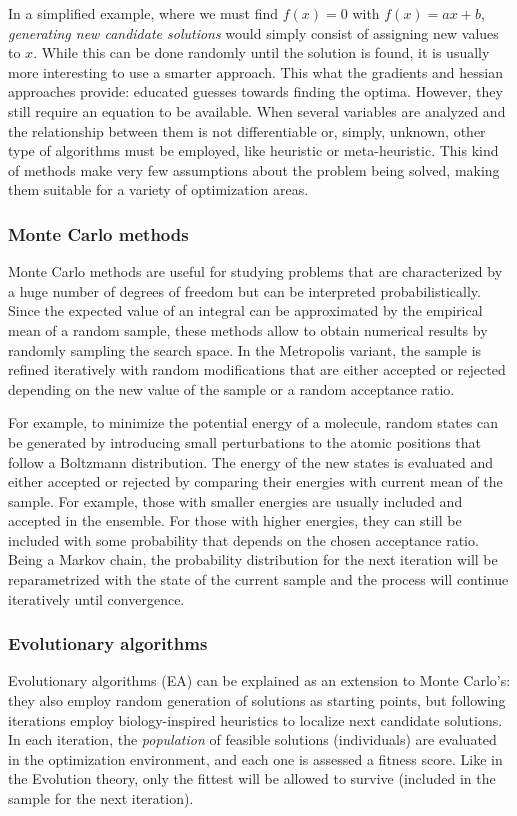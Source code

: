 In a simplified example, where we must find $f(x) = 0$ with $f(x) = ax + b$, \textit{generating new candidate solutions} would simply consist of assigning new values to $x$. While this can be done randomly until the solution is found, it is usually more interesting to use a smarter approach. This what the gradients and hessian approaches provide: educated guesses towards finding the optima. However, they still require an equation to be available. When several variables are analyzed and the relationship between them is not differentiable or, simply, unknown, other type of algorithms must be employed, like heuristic or meta-heuristic. This kind of methods make very few assumptions about the problem being solved, making them suitable for a variety of optimization areas.

\subsubsection{Monte Carlo methods}

Monte Carlo methods are useful for studying problems that are characterized by a huge number of degrees of freedom but can be interpreted probabilistically. Since the expected value of an integral can be approximated by the empirical mean of a random sample, these methods allow to obtain numerical results by randomly sampling the search space.  In the Metropolis variant, the sample is refined iteratively with random modifications that are either accepted or rejected depending on the new value of the sample or a random acceptance ratio.

For example, to minimize the potential energy of a molecule, random states can be generated by introducing small perturbations to the atomic positions that follow a Boltzmann distribution. The energy of the new states is evaluated and either accepted or rejected by comparing their energies with current mean of the sample. For example, those with smaller energies are usually included and accepted in the ensemble. For those with higher energies, they can still be included with some probability that depends on the chosen acceptance ratio. Being a Markov chain, the probability distribution for the next iteration will be reparametrized with the state of the current sample and the process will continue iteratively until convergence.

\subsubsection{Evolutionary algorithms}
Evolutionary algorithms (EA) can be explained as an extension to Monte Carlo's: they also employ random generation of solutions as starting points, but following iterations employ biology-inspired heuristics to localize next candidate solutions. In each iteration, the \textit{population} of feasible solutions (individuals) are evaluated in the optimization environment, and each one is assessed a fitness score. Like in the Evolution theory, only the fittest will be allowed to survive (included in the sample for the next iteration).

